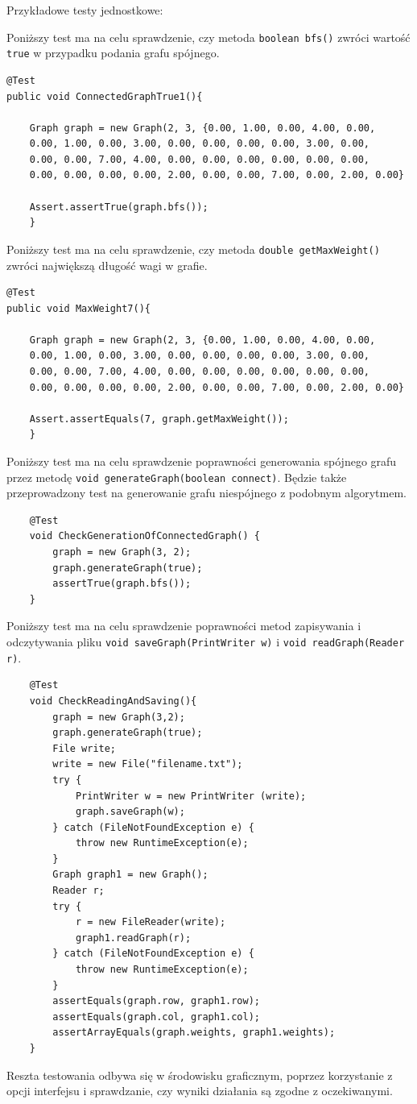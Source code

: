 \documentclass[]{article}
\begin{document}
Przykładowe testy jednostkowe:

Poniższy test ma na celu sprawdzenie, czy metoda \texttt{boolean bfs()} zwróci wartość \texttt{true} w przypadku podania grafu spójnego.

\begin{verbatim}
@Test
public void ConnectedGraphTrue1(){
    
    Graph graph = new Graph(2, 3, {0.00, 1.00, 0.00, 4.00, 0.00,
    0.00, 1.00, 0.00, 3.00, 0.00, 0.00, 0.00, 0.00, 3.00, 0.00,
    0.00, 0.00, 7.00, 4.00, 0.00, 0.00, 0.00, 0.00, 0.00, 0.00,
    0.00, 0.00, 0.00, 0.00, 2.00, 0.00, 0.00, 7.00, 0.00, 2.00, 0.00}
        
    Assert.assertTrue(graph.bfs());
    }
\end{verbatim}

Poniższy test ma na celu sprawdzenie, czy metoda \texttt{double getMaxWeight()} zwróci największą długość wagi w grafie.

\begin{verbatim}
@Test
public void MaxWeight7(){
    
    Graph graph = new Graph(2, 3, {0.00, 1.00, 0.00, 4.00, 0.00,
    0.00, 1.00, 0.00, 3.00, 0.00, 0.00, 0.00, 0.00, 3.00, 0.00,
    0.00, 0.00, 7.00, 4.00, 0.00, 0.00, 0.00, 0.00, 0.00, 0.00,
    0.00, 0.00, 0.00, 0.00, 2.00, 0.00, 0.00, 7.00, 0.00, 2.00, 0.00}
        
    Assert.assertEquals(7, graph.getMaxWeight());
    }
\end{verbatim}

Poniższy test ma na celu sprawdzenie poprawności generowania spójnego grafu przez metodę \texttt{void generateGraph(boolean connect)}. Będzie także przeprowadzony test na generowanie grafu niespójnego z podobnym algorytmem.
\begin{verbatim}
    @Test
    void CheckGenerationOfConnectedGraph() {
        graph = new Graph(3, 2);
        graph.generateGraph(true);
        assertTrue(graph.bfs());
    }
\end{verbatim}

Poniższy test ma na celu sprawdzenie poprawności metod zapisywania i odczytywania pliku \texttt{void saveGraph(PrintWriter w)} i \texttt{void readGraph(Reader r)}. 
\begin{verbatim}
    @Test
    void CheckReadingAndSaving(){
        graph = new Graph(3,2);
        graph.generateGraph(true);
        File write;
        write = new File("filename.txt");
        try {
            PrintWriter w = new PrintWriter (write);
            graph.saveGraph(w);
        } catch (FileNotFoundException e) {
            throw new RuntimeException(e);
        }
        Graph graph1 = new Graph();
        Reader r;
        try {
            r = new FileReader(write);
            graph1.readGraph(r);
        } catch (FileNotFoundException e) {
            throw new RuntimeException(e);
        }
        assertEquals(graph.row, graph1.row);
        assertEquals(graph.col, graph1.col);
        assertArrayEquals(graph.weights, graph1.weights);
    }
\end{verbatim}
Reszta testowania odbywa się w środowisku graficznym, poprzez korzystanie z opcji interfejsu i sprawdzanie, czy wyniki działania są zgodne z oczekiwanymi.
\end{document}
